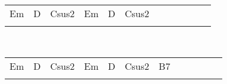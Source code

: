 \begin{multicols}{2}
\begin{minipage}{\columnwidth}
\noindent
\begin{tabular}{llllllllllll}
Em&D&Csus2&Em&D&Csus2\\
\quad\quad\quad&\quad\quad\quad&\quad\quad\quad\quad\quad&\quad\quad\quad&\quad\quad\quad&
\end{tabular}
\end{minipage}\\



\noindent
\begin{minipage}{\columnwidth}
\noindent
\noindent
\begin{tabular}{llllllllllll}
Em&D&Csus2&Em&D&Csus2&B7\\
\quad\quad\quad&\quad\quad\quad&\quad\quad\quad\quad\quad\quad&\quad\quad\quad&\quad\quad\quad&\quad\quad\quad\quad\quad&
\end{tabular}
\end{minipage}\\

\end{multicols}